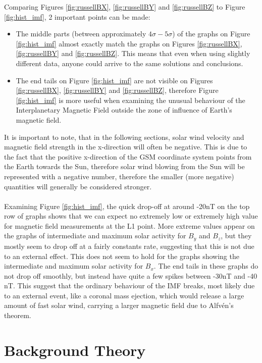\documentclass[12pt]{article}
\begin{document}
        Comparing Figures \ref{fig:russellBX}, \ref{fig:russellBY} and \ref{fig:russellBZ} to Figure \ref{fig:hist_imf}, 2 important points can be made:
        \begin{itemize}
            \item The middle parts (between approximately $4\sigma -5\sigma$) of the graphs on Figure \ref{fig:hist_imf} almost exactly match the graphs on Figures \ref{fig:russellBX}, \ref{fig:russellBY} and \ref{fig:russellBZ}. This means that even when using slightly different data, anyone could arrive to the same solutions and conclusions.
            \item The end tails on Figure \ref{fig:hist_imf} are not visible on Figures \ref{fig:russellBX}, \ref{fig:russellBY} and \ref{fig:russellBZ}, therefore Figure \ref{fig:hist_imf} is more useful when examining the unusual behaviour of the Interplanetary Magnetic Field outside the zone of influence of Earth's magnetic field.
        \end{itemize}
        It is important to note, that in the following sections, solar wind velocity and magnetic field strength in the x-direction will often be negative. This is due to the fact that the positive x-direction of the GSM coordinate system points from the Earth towards the Sun, therefore solar wind blowing from the Sun will be represented with a negative number, therefore the smaller (more negative) quantities will generally be considered stronger.\\ \\
        Examining Figure \ref{fig:hist_imf}, the quick drop-off at around -20nT on the top row of graphs shows that we can expect no extremely low or extremely high value for magnetic field measurements at the L1 point. More extreme values appear on the graphs of intermediate and maximum solar activity for $B_y$ and $B_z$, but they mostly seem to drop off at a fairly constants rate, suggesting that this is not due to an external effect. This does not seem to hold for the graphs showing the intermediate and maximum solar activity for $B_x$. The end tails in these graphs do not drop off smoothly, but instead have quite a few spikes between -30nT and -40 nT. This suggest that the ordinary behaviour of the IMF breaks, most likely due to an external event, like a coronal mass ejection, which would release a large amount of fast solar wind, carrying a larger magnetic field due to Alfvén's theorem\cite{1976alfven}.
\section{Background Theory}\label{sec:theory}
\end{document}
